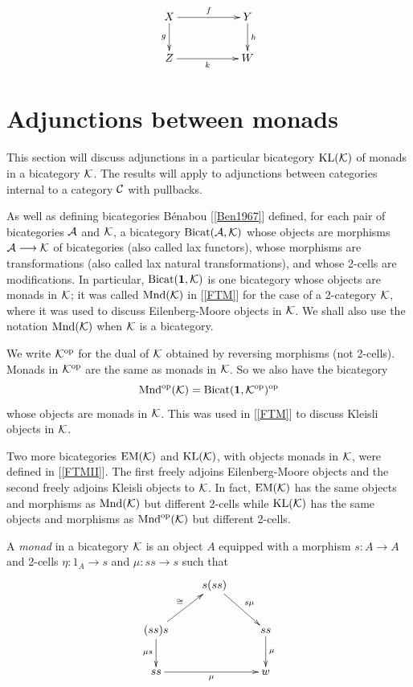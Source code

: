 \documentclass[a4paper,10pt]{article}
\newcommand{\bc}{{\cal{C}}}
\newcommand{\ba}{{\cal{A}}}
\newcommand{\bk}{{\cal{K}}}
\numberwithin{equation}{section}
\begin{document}
\begin{equation}
\xymatrix{
X \ar[rr]^-{f} \ar[d]_-{g} && Y \ar[d]^-{h} \\
Z \ar[rr]_-{k} && W}
\end{equation}

\section{Adjunctions between monads}\label{abm} 

This section will discuss adjunctions in a particular bicategory 
$\mathrm{KL} (\bk)$ of monads in a bicategory $\bk$. 
The results will apply to adjunctions between categories internal to a category $\bc$ with pullbacks.

As well as defining bicategories B\'enabou [\ref{Ben1967}] defined, 
for each pair of bicategories $\ba$ and $\bk$, a bicategory $\mathrm{Bicat} (\ba,\bk)$ 
whose objects are morphisms $\ba \longrightarrow \bk$ of bicategories (also called lax functors), whose morphisms are transformations (also called lax natural transformations), 
and whose 2-cells are modifications. 
In particular, $\mathrm{Bicat} (\bf{1} ,\bk)$ is one bicategory whose objects are monads in $\bk$; 
it was called $\mathrm{Mnd}(\bk)$ in [\ref{FTM}] for the case of a 2-category $\bk$, 
where it was used to discuss Eilenberg-Moore objects in $\bk$. 
We shall also use the notation $\mathrm{Mnd}(\bk)$ when $\bk$ is a bicategory.  

We write $\bk^{\mathrm{op}}$ for the dual of $\bk$ obtained by reversing morphisms (not 2-cells). 
Monads in $\bk^{\mathrm{op}}$ are the same as monads in $\bk$. 
So we also have the bicategory 
$$\mathrm{Mnd}^{\mathrm{op}}(\bk) = \mathrm{Bicat} (\bf{1} ,\bk^{\mathrm{op}})^{\mathrm{op}}$$
whose objects are monads in $\bk$. This was used in [\ref{FTM}] to discuss Kleisli objects in $\bk$.

Two more bicategories $\mathrm{EM} (\bk)$ and $\mathrm{KL} (\bk)$, with objects monads in $\bk$, were defined in [\ref{FTMII}]. 
The first freely adjoins Eilenberg-Moore objects and the second freely adjoins Kleisli objects to $\bk$. 
In fact, $\mathrm{EM} (\bk)$ has the same objects and morphisms as $\mathrm{Mnd}(\bk)$ 
but different 2-cells while $\mathrm{KL} (\bk)$ has the same objects and morphisms as 
$\mathrm{Mnd}^{\mathrm{op}}(\bk)$ but different 2-cells.  

A {\it monad} in a bicategory $\bk$ is an object $A$ equipped with a morphism 
$s:A \longrightarrow A$ and 2-cells $\eta : 1_A \longrightarrow s$ and $\mu : ss \longrightarrow s$ 
such that 
\begin{equation}\xymatrix{
& s(ss) \ar[rd]^-{ s \mu}  & \\
(ss)s \ar[ru]^-{\cong} \ar[d]_-{\mu s} & & ss \ar[d]^-{\mu} \\
ss \ar[rr]_-{\mu} & & w 
}\end{equation}
\end{document}
